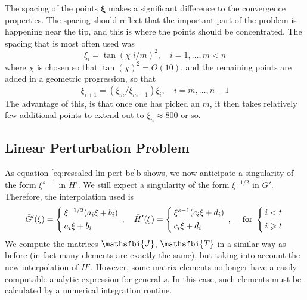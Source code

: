 \documentclass{jfm}
\begin{document}
The spacing of the points $\boldsymbol{\xi}$ makes a significant difference to 
the convergence properties. The spacing should reflect that the important 
part of the problem is happening near the tip, and this is where the points
should be concentrated. The spacing that is most often used was 
\begin{equation}
\xi_i = \tan( \chi \; i/m )^2, \quad i=1,\dots,m < n
\end{equation}
where $\chi$ is chosen so that $\tan(\chi)^2 = O(10)$, and the remaining points
are added in a geometric progression, so that 
\begin{equation}
\xi_{i+1} = (\xi_m/\xi_{m-1})\xi_{i} , \quad i = m,\dots,n-1
\end{equation}
The advantage of this, is that once one has picked an $m$, it then takes
relatively few additional points to extend out to $\xi_n \approx 800$ or so.
%
%
\subsection{Linear Perturbation Problem}
%
%
As equation \ref{eq:rescaled-lin-pert-bc}b shows, we now anticipate a 
singularity of the form $\xi^{s-1}$ in $\tilde{H}'$. We still expect a
singularity of the form $\xi^{-1/2}$ in $\tilde{G}'$. Therefore, the
interpolation used is
\begin{equation}
\setlength{\arraycolsep}{2pt}
\tilde{G}'(\xi) = \left\{ \begin{array}{l}  
\xi^{-1/2}(a_i \xi + b_i) \\[4pt]
a_i \xi + b_i
 \end{array}\right., \quad
\tilde{H}'(\xi) = \left\{ \begin{array}{l}  
\xi^{s-1}(c_i \xi + d_i) \\[4pt]
c_i \xi + d_i
 \end{array}\right. , \quad
\; \mbox{for\ } \left\{ \begin{array}{l}  
i<t\\[4pt]
i\geq t
\end{array}\right.
\end{equation}
We compute the matrices $\mathsfbi{J}$, $\mathsfbi{T}$ in a similar way as 
before (in fact many elements are exactly the same), but taking into account 
the new interpolation of $\tilde{H}'$. However, some matrix elements no longer
have a easily computable analytic expression for general $s$. In this case, 
such elements must be calculated by a numerical integration routine. 
\end{document}
